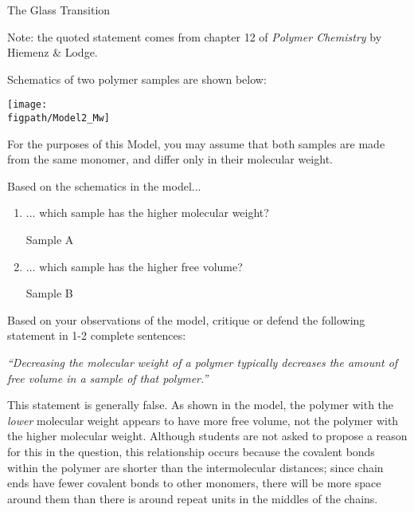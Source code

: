 \begin{activity}{The Glass Transition}
\begin{ctqs}
\begin{solution}[1.75in]
					Note: the quoted statement comes from chapter 12 of \emph{Polymer Chemistry} by Hiemenz \& Lodge.
				
				\end{solution}
	
\end{ctqs}

\begin{model}
\label{\labelbase:mdl:chainends}
	
	Schematics of two polymer samples are shown below:
	
	\vspace{6pt}
	\centerline{\texttt{[image: \\figpath/Model2\_Mw]}}
	
	For the purposes of this Model, you may assume that both samples are made from the same monomer, and differ only in their molecular weight.
	
\end{model}

\begin{ctqs}

	\question Based on the schematics in the model...
		\begin{enumerate}
			\item ... which sample has the higher molecular weight?
				
				\begin{solution}[0.25in]
					Sample A
				\end{solution}
				
			\item ... which sample has the higher free volume?
				
				\begin{solution}[0.25in]
					Sample B
				\end{solution}
				
		\end{enumerate}
		
	\question Based on your observations of the model, critique or defend the following statement in 1-2 complete sentences:
	
		\emph{``Decreasing the molecular weight of a polymer typically decreases the amount of free volume in a sample of that polymer.''}
		
		\begin{solution}[1.5in]
			This statement is generally false.  As shown in the model, the polymer with the \emph{lower} molecular weight appears to have more free volume, not the polymer with the higher molecular weight.  Although students are not asked to propose a reason for this in the question, this relationship occurs because the covalent bonds within the polymer are shorter than the intermolecular distances; since chain ends have fewer covalent bonds to other monomers, there will be more space around them than there is around repeat units in the middles of the chains.
		\end{solution}
	

\end{ctqs}
\end{activity}
